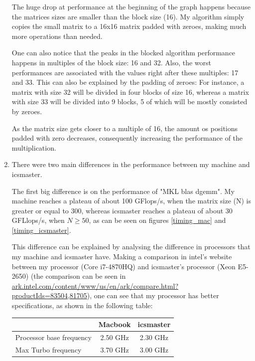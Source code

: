 \documentclass[unicode,11pt,a4paper,oneside,numbers=endperiod,openany]{scrartcl}
\begin{document}
\begin{enumerate}
            The huge drop at performance at the beginning of the graph happens because the matrices sizes are smaller than the block size (16).
            My algorithm simply copies the small matrix to a 16x16 matrix padded with zeroes, making much more operations than needed.

            One can also notice that the peaks in the blocked algorithm performance happens in multiples of the block size: 16 and 32.
            Also, the worst performances are associated with the values right after these multiples: 17 and 33.
            This can also be explained by the padding of zeroes:
            For instance, a matrix with size 32 will be divided in four blocks of size 16, whereas a matrix with size 33 will be divided into 9 blocks, 5 of which will be mostly consisted by zeroes.
            
            As the matrix size gets closer to a multiple of 16, the amount os positions padded with zero decreases, consequently increasing the performance of the multiplication.
            
            
        \item %
            There were two main differences in the performance between my machine and icsmaster.

            The first big difference is on the performance of "MKL blas dgemm".
            My machine reaches a plateau of about 100 GFlops/s, when the matrix size (N) is greater or equal to 300, whereas icsmaster reaches a plateau of about 30 GFLlops/s, when $N \geq 50$, as can be seen on figures \ref{timing_mac} and \ref{timing_icsmaster}.

            This difference can be explained by analysing the difference in processors that my machine and icsmaster have.
            \sloppy Making a comparison in intel's website between my processor (Core i7-4870HQ) and icsmaster's processor (Xeon E5-2650) (the comparison can be seen in \href{https://ark.intel.com/content/www/us/en/ark/compare.html?productIds=83504,81705}{ark.intel.com/content/www/us/en/ark/compare.html?productIds=83504,81705}), one can see that my processor has better specifications, as shown in the following table:

            \begin{center}
                \begin{tabular}{| l || c | c |}
                        \hline
                    & \textbf{Macbook} & \textbf{icsmaster} \\
                    \hline
                    Processor base frequency & 2.50 GHz  & 2.30 GHz \\ 
                    \hline
                    Max Turbo frequency & 3.70 GHz & 3.00 GHz \\
                    \hline
                \end{tabular}
            \end{center}


\end{enumerate}
\end{document}

